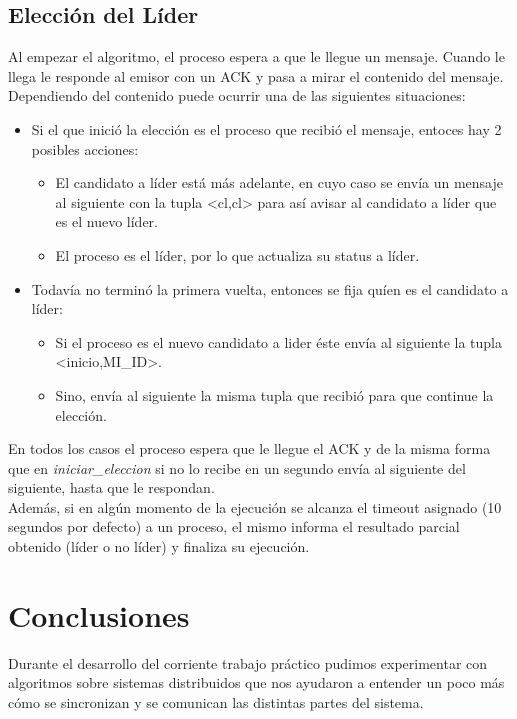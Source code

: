 \documentclass[hidelinks,a4paper,12pt, nofootinbib]{article}
\begin{document}
\subsection{Elección del Líder}
Al empezar el algoritmo, el proceso espera a que le llegue un mensaje. Cuando le llega le responde al emisor con un ACK y pasa a mirar el contenido del mensaje. Dependiendo del contenido puede ocurrir una de las siguientes situaciones:
\begin{itemize}
	\item Si el que inició la elección es el proceso que recibió el mensaje, entoces hay 2 posibles acciones:
	\begin{itemize}
		\item El candidato a líder está más adelante, en cuyo caso se envía un mensaje al siguiente con la tupla <cl,cl> para así avisar al candidato a líder que es el nuevo líder.
		\item El proceso es el líder, por lo que actualiza su status a líder.
	\end{itemize}
	\item Todavía no terminó la primera vuelta, entonces se fija quíen es el candidato a líder:
		\begin{itemize}
			\item Si el proceso es el nuevo candidato a lider éste envía al siguiente la tupla <inicio,MI\_ID>.
			\item Sino, envía al siguiente la misma tupla que recibió para que continue la elección.
		\end{itemize}
\end{itemize}

En todos los casos el proceso espera que le llegue el ACK y de la misma forma que en \textit{iniciar\_eleccion} si no lo recibe en un  segundo envía al siguiente del siguiente, hasta que le respondan. \\

Además, si en algún momento de la ejecución se alcanza el timeout asignado (10 segundos por defecto) a un proceso, el mismo informa el resultado parcial obtenido (líder o no líder) y finaliza su ejecución.
\section{Conclusiones}
Durante el desarrollo del corriente trabajo práctico pudimos experimentar con algoritmos sobre sistemas distribuidos que nos ayudaron a entender un poco más cómo se sincronizan y se comunican las distintas partes del sistema.%
\end{document}
